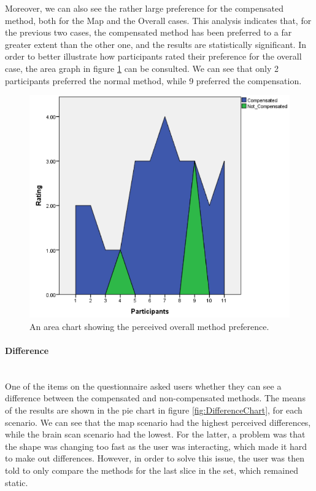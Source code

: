 \documentclass[]{article}
\begin{document}
Moreover, we can also see the rather large preference for the compensated method, both for the Map and the Overall cases. This analysis indicates that, for the previous two cases, the compensated method has been preferred to a far greater extent than the other one, and the results are statistically significant. In order to better illustrate how participants rated their preference for the overall case, the area graph in figure \ref{fig:Preference_Area} can be consulted. We can see that only 2 participants preferred the normal method, while 9 preferred the compensation. 

\begin{figure}[!h]
    \centering
    \includegraphics[width=1.0\textwidth]{figures/results/Preference_Area.PNG}
    \caption{An area chart showing the perceived overall method preference.}
    \label{fig:Preference_Area}
\end{figure}

\paragraph{Difference}\mbox{}\\

One of the items on the questionnaire asked users whether they can see a difference between the compensated and non-compensated methods. The means of the results are shown in the pie chart in figure \ref{fig:DifferenceChart}, for each scenario. We can see that the map scenario had the highest perceived differences, while the brain scan scenario had the lowest. For the latter, a problem was that the shape was changing too fast as the user was interacting, which made it hard to make out differences. However, in order to solve this issue, the user was then told to only compare the methods for the last slice in the set, which remained static.
\end{document}
